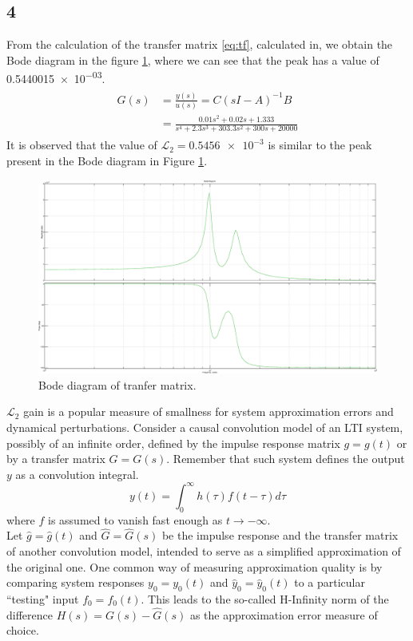 \subsection{4}
From the calculation of the transfer matrix \eqref{eq:tf}, calculated in, we
obtain the Bode diagram in the figure \ref{fig:bodeplot}, where we can see that
the peak has a value of \num{0.5440015e-03}.
\begin{align}
	\label{eq:tf}
	\begin{split}
		G(s) 	& = \frac{y(s)}{u(s)} = C(sI-A)^{-1}B\\
				& = \frac{0.01 s^2 + 0.02 s + 1.333}{s^4 + 2.3 s^3 + 303.3 s^2 + 300 s + 20000}
	\end{split}
\end{align}
It is observed that the value of \(\mathcal{L}_{2} = \num{0.5456e-3}\)  is
similar to the peak present in the Bode diagram in Figure \ref{fig:bodeplot}.
\begin{figure}[htb]
	\centering
	\includegraphics[width=0.75\linewidth]{bode}
	\caption{Bode diagram of tranfer matrix.}
	\label{fig:bodeplot}
\end{figure}
%
\(\mathcal{L}_{2}\) gain is a popular measure of smallness for system
approximation errors and dynamical perturbations.
Consider a causal convolution model of an LTI system, possibly of an
infinite order, defined by the impulse response matrix \(g = g(t)\) or by a
transfer matrix \(G = G(s)\).
Remember that such system defines the output \(y\) as a convolution integral.
\begin{equation}
	\label{eq:convintegral}
	y(t) = \int_{0}^{\infty} h(\tau)f(t-\tau)d\tau
\end{equation}
%
where \(f\) is assumed to vanish fast enough as \(t \rightarrow -\infty\).\\
Let \(\hat{g} = \hat{g}(t)\) and \(\hat{G} = \hat{G}(s)\) be the impulse
response and the transfer matrix of another convolution model, intended to
serve as a simplified approximation of the original one.
One common way of measuring approximation quality is by comparing system
responses \(y_{0} = y_{0}(t)\) and \(\hat{y}_{0} = \hat{y}_{0}(t)\) to a
particular ``testing" input \(f_{0} = f_{0}(t)\).
This leads to the so-called H-Infinity norm of the difference
 \(H(s) = G(s) - \hat{G}(s)\) as the approximation error measure of choice.\cite{l2gain}

